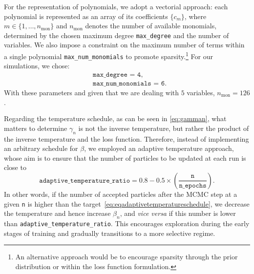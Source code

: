 \documentclass[11pt,a4paper]{article}
\begin{document}
	 For the representation of polynomials, we adopt a vectorial approach: each polynomial is represented as an array of its coefficients $\{c_m\}$, where $m \in \{1,\dots,n_{\text{mon}}\}$ and $n_{\text{mon}}$ denotes the number of available monomials, determined by the chosen maximum degree \texttt{max\_degree} and the number of variables. We also impose a constraint on the maximum number of terms within a single polynomial \texttt{max\_num\_monomials} to promote sparsity.\footnote{An alternative approach would be to encourage sparsity through the prior distribution or within the loss function formulation.} For our simulations, we chose:
	\begin{equation} \label{eq:parampol}
		\begin{aligned}
			&\texttt{max\_degree = 4},\\
			&\texttt{max\_num\_monomials = 6.}
		\end{aligned}
	\end{equation}
With these parameters and given that we are dealing with $5$ variables, $n_{\text{mon}} = 126$.
	
Regarding the temperature schedule, as can be seen in \eqref{eq:gamman}, what matters to determine $\gamma_{n}$ is not the inverse temperature, but rather the product of the inverse temperature and the loss function. Therefore, instead of implementing an arbitrary schedule for $\beta$, we employed an adaptive temperature approach, whose aim is to ensure that the number of particles to be updated at each run is close to
\begin{equation} \label{eq:eqadaptivetemperatureschedule}
	\texttt{adaptive\_temperature\_ratio} = 0.8 - 0.5 \times \left(\frac{\texttt{n}}{\texttt{n\_epochs}}\right).
\end{equation}
In other words, if the number of accepted particles after the MCMC step at a given \texttt{n} is higher than the target~\eqref{eq:eqadaptivetemperatureschedule}, we decrease the temperature and hence increase $\beta_{n}$, and \textit{vice versa} if this number is lower than \texttt{adaptive\_temperature\_ratio}. This encourages exploration during the early stages of training and gradually transitions to a more selective regime.

	
	
\end{document}

